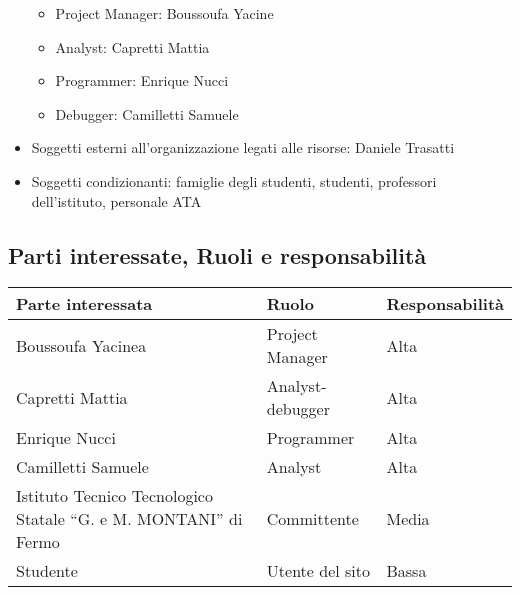 \documentclass{article}
\begin{document}
\begin{flushleft}
\begin{itemize}
\begin{itemize}
				\item Project Manager: Boussoufa Yacine

				\item Analyst: Capretti Mattia

				\item Programmer: Enrique Nucci

				\item Debugger: Camilletti Samuele

			\end{itemize}

			\item Soggetti esterni all'organizzazione legati alle risorse: Daniele Trasatti

			\item Soggetti condizionanti: famiglie degli studenti, studenti, professori dell'istituto, personale ATA

		\end{itemize}

		\subsection{Parti interessate, Ruoli e responsabilità}

		\begin{tabular}{ |p{4cm}|p{4cm}|p{4cm}|  }

			\hline

			Parte interessata&Ruolo &Responsabilità\\

			\hline

			Boussoufa Yacinea&Project Manager&Alta\\

			\hline

			Capretti Mattia&Analyst-debugger&Alta\\

			\hline

			Enrique Nucci&Programmer&Alta\\

			\hline

			Camilletti Samuele&Analyst&Alta\\

			\hline

			Istituto Tecnico Tecnologico Statale “G. e M. MONTANI” di Fermo&Committente&Media\\

        	\hline

        	Studente   & Utente del sito & Bassa \\


\end{tabular}
\end{flushleft}
\end{document}
